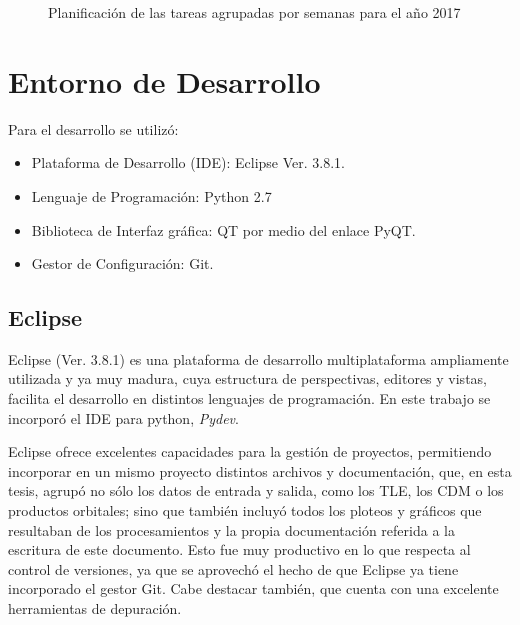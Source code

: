\begin{figure}[H]
  \centering
  \caption{Planificaci\'on de las tareas agrupadas por semanas para el año 2017}
  \label{fig:plan2017}
\end{figure}

\section{Entorno de Desarrollo}\label{sec:entorno}

Para el desarrollo se utiliz\'o:
\begin{itemize}
 \item Plataforma de Desarrollo (\ac{IDE}): Eclipse Ver. 3.8.1.
 \item Lenguaje de Programaci\'on: Python 2.7
 \item Biblioteca de Interfaz gr\'afica: QT por medio del enlace PyQT.
 \item Gestor de Configuraci\'on: Git.
\end{itemize}

\subsection*{Eclipse}
Eclipse (Ver. 3.8.1) es una plataforma de desarrollo multiplataforma ampliamente utilizada y ya muy madura, cuya estructura de perspectivas, editores y vistas, facilita el desarrollo en distintos lenguajes de programaci\'on. En este trabajo se incorpor\'o el IDE para python, {\it{Pydev}}.

Eclipse ofrece excelentes capacidades para la gesti\'on de proyectos, permitiendo incorporar en un mismo proyecto distintos archivos y documentaci\'on, que, en esta tesis, agrup\'o no s\'olo los datos de entrada y salida, como los TLE, los CDM o los productos orbitales; sino que tambi\'en incluy\'o todos los ploteos y gr\'aficos que resultaban de los procesamientos y la propia documentaci\'on referida a la escritura de este documento. Esto fue muy productivo en lo que respecta al control de versiones, ya que se aprovech\'o el hecho de que Eclipse ya tiene incorporado el gestor Git.
Cabe destacar también, que cuenta con una excelente herramientas de depuraci\'on.\\

